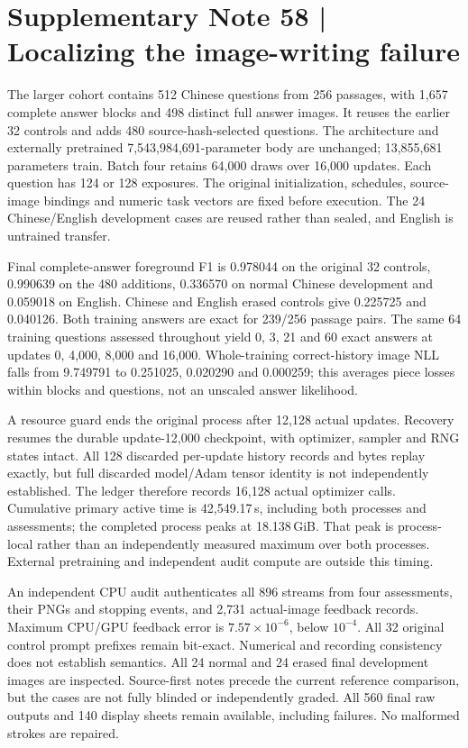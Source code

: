 \documentclass[10pt,a4paper]{article}
\begin{document}
\clearpage
\section*{Supplementary Note 58 | Localizing the image-writing failure}
\label{note:writing-failure}
The larger cohort contains 512 Chinese questions from 256 passages, with
1,657 complete answer blocks and 498 distinct full answer images. It reuses
the earlier 32 controls and adds 480 source-hash-selected questions. The
architecture and externally pretrained 7,543,984,691-parameter body are
unchanged; 13,855,681 parameters train. Batch four retains 64,000 draws over
16,000 updates. Each question has 124 or 128 exposures. The original
initialization, schedules, source-image bindings and numeric task vectors
are fixed before execution. The 24 Chinese/English development cases are
reused rather than sealed, and English is untrained transfer.

Final complete-answer foreground F1 is 0.978044 on the original 32 controls,
0.990639 on the 480 additions, 0.336570 on normal Chinese development and
0.059018 on English. Chinese and English erased controls give 0.225725 and
0.040126. Both training answers are exact for 239/256 passage pairs. The same
64 training questions assessed throughout yield 0, 3, 21 and 60 exact answers
at updates 0, 4,000, 8,000 and 16,000. Whole-training correct-history image
NLL falls from 9.749791 to 0.251025, 0.020290 and 0.000259; this averages
piece losses within blocks and questions, not an unscaled answer likelihood.

A resource guard ends the original process after 12,128 actual updates.
Recovery resumes the durable update-12,000 checkpoint, with optimizer,
sampler and RNG states intact. All 128 discarded per-update history records
and bytes replay exactly, but full discarded model/Adam tensor identity is
not independently established. The ledger therefore records 16,128 actual
optimizer calls. Cumulative primary active time is 42,549.17\,s, including
both processes and assessments; the completed process peaks at
18.138\,GiB. That peak is process-local rather than an independently measured
maximum over both processes. External pretraining and independent audit
compute are outside this timing.

An independent CPU audit authenticates all 896 streams from four assessments,
their PNGs and stopping events, and 2,731 actual-image feedback records.
Maximum CPU/GPU feedback error is $7.57\times10^{-6}$, below $10^{-4}$.
All 32 original control prompt prefixes remain bit-exact. Numerical and
recording consistency does not establish semantics. All 24 normal and
24 erased final development images are inspected. Source-first notes precede
the current reference comparison, but the cases are not fully blinded or
independently graded. All 560 final raw outputs and 140 display sheets remain
available, including failures. No malformed strokes are repaired.
\end{document}
